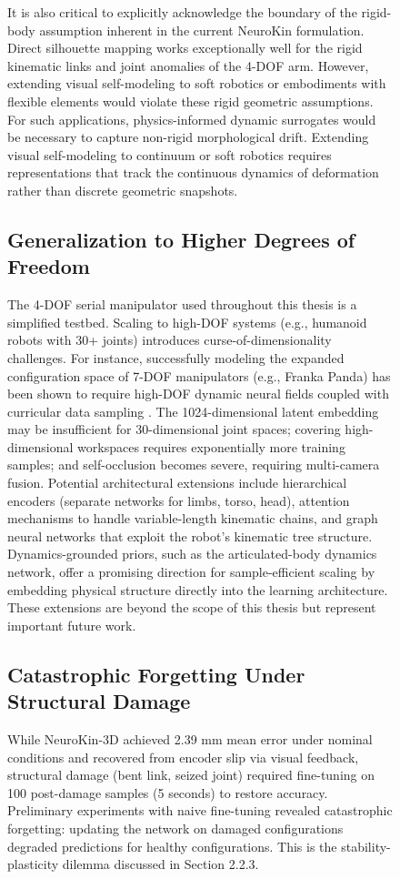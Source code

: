 \documentclass[12pt,a4paper,oneside]{report}
\begin{document}
\begin{figure}[H]
It is also critical to explicitly acknowledge the boundary of the rigid-body assumption inherent in the current NeuroKin formulation. Direct silhouette mapping works exceptionally well for the rigid kinematic links and joint anomalies of the 4-DOF arm. However, extending visual self-modeling to soft robotics or embodiments with flexible elements would violate these rigid geometric assumptions. For such applications, physics-informed dynamic surrogates would be necessary to capture non-rigid morphological drift. Extending visual self-modeling to continuum or soft robotics requires representations that track the continuous dynamics of deformation rather than discrete geometric snapshots.

\subsection{Generalization to Higher Degrees of Freedom}

The 4-DOF serial manipulator used throughout this thesis is a simplified testbed. Scaling to high-DOF systems (e.g., humanoid robots with 30+ joints) introduces curse-of-dimensionality challenges. For instance, successfully modeling the expanded configuration space of 7-DOF manipulators (e.g., Franka Panda) has been shown to require high-DOF dynamic neural fields coupled with curricular data sampling \cite{schulze2024high}. The 1024-dimensional latent embedding may be insufficient for 30-dimensional joint spaces; covering high-dimensional workspaces requires exponentially more training samples; and self-occlusion becomes severe, requiring multi-camera fusion. Potential architectural extensions include hierarchical encoders (separate networks for limbs, torso, head), attention mechanisms to handle variable-length kinematic chains, and graph neural networks that exploit the robot's kinematic tree structure. Dynamics-grounded priors, such as the articulated-body dynamics network, offer a promising direction for sample-efficient scaling by embedding physical structure directly into the learning architecture. These extensions are beyond the scope of this thesis but represent important future work.

\subsection{Catastrophic Forgetting Under Structural Damage}

While NeuroKin-3D achieved 2.39 mm mean error under nominal conditions and recovered from encoder slip via visual feedback, structural damage (bent link, seized joint) required fine-tuning on 100 post-damage samples (5 seconds) to restore accuracy. Preliminary experiments with naive fine-tuning revealed catastrophic forgetting: updating the network on damaged configurations degraded predictions for healthy configurations. This is the stability-plasticity dilemma discussed in Section 2.2.3.


\end{figure}
\end{document}
